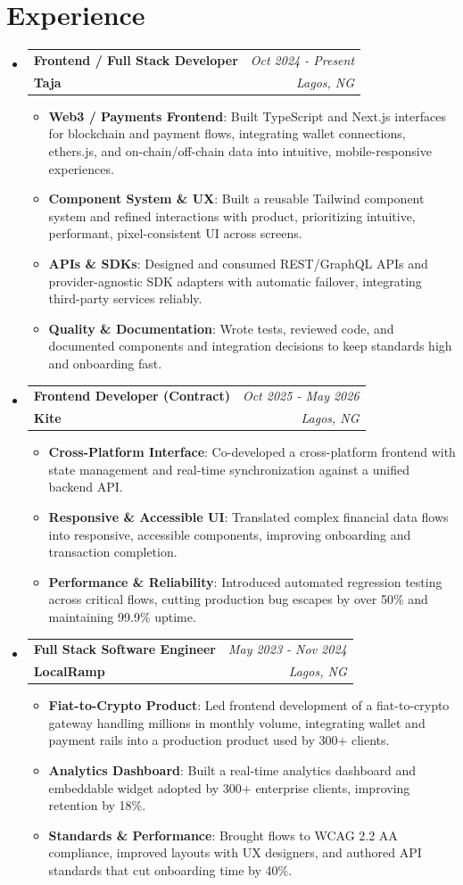 \documentclass[a4paper]{article}
\makeatletter
\newcommand{\resumeItem}[2]{ \item\small{ \textbf{#1}: #2 } }
\newcommand{\resumeJobHeading}[4]{ %
\vspace{2pt}
\item[]
\begin{tabular*}{0.97\textwidth}{l@{\extracolsep{\fill}}r}
	\textbf{#1} & \textit{#3} \\
	\textbf{#4} & \textit{#2} \\
\end{tabular*}
\vspace{0pt}
}
\newcommand{\resumeSubHeadingListStart}{\begin{itemize}[leftmargin=*,topsep=1pt]}
\newcommand{\resumeSubHeadingListEnd}{\end{itemize}}
\newcommand{\resumeItemListStart}{\begin{itemize}[topsep=0pt,itemsep=0pt,parsep=0pt]}
\newcommand{\resumeItemListEnd}{\end{itemize}}
\makeatother
\begin{document}
	\vspace{4pt}
	\section{Experience}
	\resumeSubHeadingListStart
	\resumeJobHeading{Frontend / Full Stack Developer}{Lagos, NG}{Oct 2024 - Present}{Taja}
	\resumeItemListStart
	\resumeItem{Web3 / Payments Frontend}
	{Built TypeScript and Next.js interfaces for blockchain and payment flows, integrating wallet connections, ethers.js, and on-chain/off-chain data into intuitive, mobile-responsive experiences.}
	\resumeItem{Component System \& UX}
	{Built a reusable Tailwind component system and refined interactions with product, prioritizing intuitive, performant, pixel-consistent UI across screens.}
	\resumeItem{APIs \& SDKs}
	{Designed and consumed REST/GraphQL APIs and provider-agnostic SDK adapters with automatic failover, integrating third-party services reliably.}
	\resumeItem{Quality \& Documentation}
	{Wrote tests, reviewed code, and documented components and integration decisions to keep standards high and onboarding fast.}
	\resumeItemListEnd

	\resumeJobHeading{Frontend Developer (Contract)}{Lagos, NG}{Oct 2025 - May 2026}{Kite}
	\resumeItemListStart
	\resumeItem{Cross-Platform Interface}
	{Co-developed a cross-platform frontend with state management and real-time synchronization against a unified backend API.}
	\resumeItem{Responsive \& Accessible UI}
	{Translated complex financial data flows into responsive, accessible components, improving onboarding and transaction completion.}
	\resumeItem{Performance \& Reliability}
	{Introduced automated regression testing across critical flows, cutting production bug escapes by over 50\% and maintaining 99.9\% uptime.}
	\resumeItemListEnd

	\resumeJobHeading{Full Stack Software Engineer}{Lagos, NG}{May 2023 - Nov 2024}{LocalRamp}
	\resumeItemListStart
	\resumeItem{Fiat-to-Crypto Product}
	{Led frontend development of a fiat-to-crypto gateway handling millions in monthly volume, integrating wallet and payment rails into a production product used by 300+ clients.}
	\resumeItem{Analytics Dashboard}
	{Built a real-time analytics dashboard and embeddable widget adopted by 300+ enterprise clients, improving retention by 18\%.}
	\resumeItem{Standards \& Performance}
	{Brought flows to WCAG 2.2 AA compliance, improved layouts with UX designers, and authored API standards that cut onboarding time by 40\%.}
	\resumeItemListEnd
	\resumeSubHeadingListEnd
\end{document}
